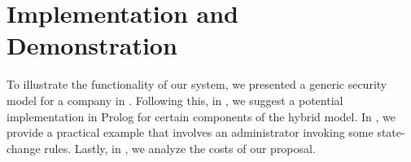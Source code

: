 
\chapter{Implementation and Demonstration}
\label{sec:implementation}

To illustrate the functionality of our system, we presented a generic security model for a company in . Following this, in , we suggest a potential implementation in Prolog for certain components of the hybrid model. In , we provide a practical example that involves an administrator invoking some state-change rules. Lastly, in , we analyze the costs of our proposal.


% 



